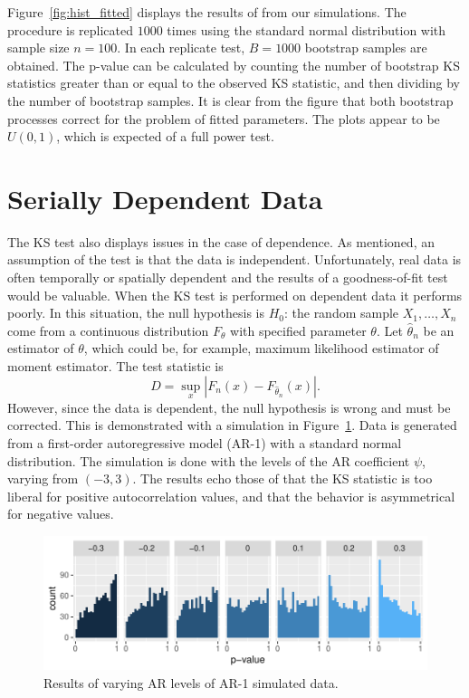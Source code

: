 \documentclass[12pt, letterpaper, titlepage]{article}
\begin{document}
Figure~\ref{fig:hist_fitted} displays the results of from our simulations. The 
procedure is replicated $1000$ times using the standard normal distribution with
sample size $n=100$. In each replicate test, $B = 1000$ bootstrap samples are 
obtained. The p-value can be calculated by counting the number of bootstrap KS 
statistics greater than or equal to the observed KS statistic, and then dividing 
by the number of bootstrap samples. It is clear from the figure that both
bootstrap processes correct for the problem of fitted parameters. The plots 
appear to be $U(0,1)$, which is expected of a full power test.

\section{Serially Dependent Data}\label{sec:dependence}

The KS test also displays issues in the case of dependence. As mentioned, an 
assumption of the test is that the data is independent. Unfortunately, real data
is often temporally or spatially dependent and the results of a goodness-of-fit 
test would be valuable. When the KS test is performed on dependent data it 
performs poorly. In this situation, the null hypothesis is $H_0$: the random 
sample $X_1, \ldots, X_n$ come from a continuous distribution $F_{\theta}$ with 
specified parameter $\theta$.
Let $\hat\theta_n$ be an estimator of $\theta$, which could be, for example,
maximum likelihood estimator of moment estimator. The test statistic is
\[
  D = \sup_x | F_n(x) - F_{\hat\theta_n}(x) |.
\]
However, since the data is dependent, the null hypothesis is wrong and must be 
corrected. This is demonstrated with a simulation in 
Figure~\ref{fig:hist_correlation}. Data is generated from a first-order 
autoregressive model (AR-1) with a standard normal distribution. The simulation
is done with the levels of the AR coefficient $\psi$, varying from $(-3,3)$. 
The results echo those of \citet{Durilleul} that the KS statistic is too liberal 
for positive autocorrelation values, and that the behavior is asymmetrical for 
negative values.

\begin{figure}[tbp]
  \centering
  \includegraphics{hist_correlation}
  \caption{Results of varying AR levels of AR-1 simulated data.}
  \label{fig:hist_correlation}
\end{figure}
\end{document}

